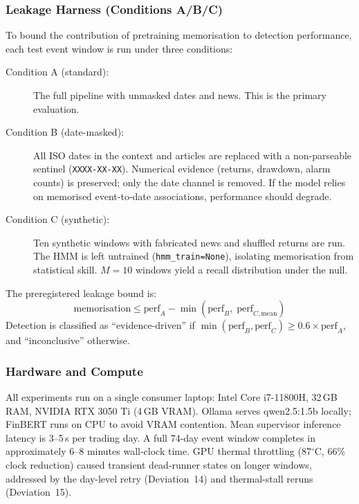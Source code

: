 \documentclass[11pt,a4paper]{article}
\begin{document}
\subsubsection{Leakage Harness (Conditions A/B/C)}

To bound the contribution of pretraining memorisation to detection performance,
each test event window is run under three conditions:

\begin{description}
  \item[Condition A (standard):] The full pipeline with unmasked dates and news.
        This is the primary evaluation.
  \item[Condition B (date-masked):] All ISO dates in the context and articles
        are replaced with a non-parseable sentinel (\texttt{XXXX-XX-XX}).
        Numerical evidence (returns, drawdown, alarm counts) is preserved; only
        the date channel is removed. If the model relies on memorised
        event-to-date associations, performance should degrade.
  \item[Condition C (synthetic):] Ten synthetic windows with fabricated news and
        shuffled returns are run. The HMM is left untrained
        (\texttt{hmm\_train=None}), isolating memorisation from statistical
        skill. $M = 10$ windows yield a recall distribution under the null.
\end{description}

\noindent The preregistered leakage bound is:
\[
  \text{memorisation} \leq \text{perf}_A - \min(\text{perf}_B,\;\text{perf}_{C,\text{mean}})
\]
Detection is classified as ``evidence-driven'' if
$\min(\text{perf}_B, \text{perf}_{C}) \geq 0.6 \times \text{perf}_A$, and
``inconclusive'' otherwise.

\subsubsection{Hardware and Compute}

All experiments run on a single consumer laptop: Intel Core i7-11800H,
32\,GB RAM, NVIDIA RTX 3050 Ti (4\,GB VRAM). Ollama serves qwen2.5:1.5b
locally; FinBERT runs on CPU to avoid VRAM contention. Mean supervisor
inference latency is 3--5\,s per trading day. A full 74-day event window
completes in approximately 6--8 minutes wall-clock time. GPU thermal
throttling (87$^\circ$C, 66\% clock reduction) caused transient dead-runner
states on longer windows, addressed by the day-level retry
(Deviation~14) and thermal-stall reruns (Deviation~15).
\end{document}
